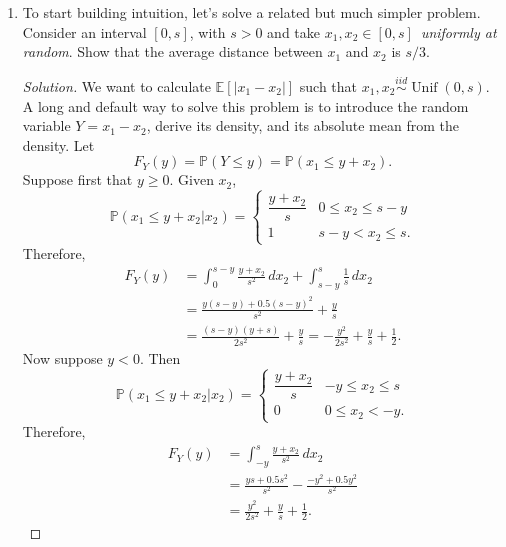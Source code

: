 \documentclass[a4paper,10pt, notitlepage]{report}
\newcommand{\unif}{\operatorname{Unif}}
\newcommand{\ev}{\mathbb{E}}
\newcommand{\pr}{\mathbb{P}}
\begin{document}
\begin{enumerate}
 \item To start building intuition, let's solve a related but much simpler problem.
 Consider an interval $[0, s]$, with $s>0$ and take $x_1,x_2 \in [0, s]$~\textit{uniformly at random}.
 Show that the average distance between $x_1$ and $x_2$ is $s/3$.

 \begin{proof}[Solution]
    We want to calculate $\ev[|x_1 - x_2|]$ such that $x_1, x_2
    \overset{iid}{\sim} \unif(0,s)$. A long and default way to solve this problem is
    to introduce the random variable $Y = x_1 - x_2$, derive its density,
    and its absolute mean from the density. Let
    \begin{equation*}
        F_Y(y) = \pr(Y \le y) = \pr(x_1 \le y + x_2).
    \end{equation*}
    Suppose first that $y \ge 0$. Given
    $x_2$, 
    $$\pr(x_1 \le y + x_2|x_2) = \begin{cases}
        \dfrac{y + x_2}{s} &0 \le x_2 \le s - y \\
        1 &s - y < x_2 \le s.
    \end{cases}$$
    Therefore, 
    \begin{equation*}
        \begin{split}
            F_Y(y) &= \int_0^{s-y} \frac{y+x_2}{s^2} \, dx_2 + \int_{s-y}^s \frac{1}{s} \, dx_2  \\
            &= \frac{y(s-y) + 0.5(s-y)^2}{s^2} + \frac{y}{s} \\
            &= \frac{(s-y)(y + s)}{2s^2} + \frac{y}{s} = - \frac{y^2}{2s^2} + \frac{y}{s} + \frac{1}{2}.
        \end{split}
    \end{equation*}
    Now suppose $y < 0$. Then 
    $$\pr(x_1 \le y + x_2|x_2) = \begin{cases}
        \dfrac{y + x_2}{s} &-y \le x_2 \le s \\
        0 &0 \le x_2 < -y.
    \end{cases}$$
    Therefore, 
    \begin{equation*}
        \begin{split}
            F_Y(y) &= \int_{-y}^{s} \frac{y+x_2}{s^2} \, dx_2 \\
            &= \frac{ys + 0.5s^2}{s^2} - \frac{-y^2 + 0.5y^2}{s^2} \\
            &= \frac{y^2}{2s^2} + \frac{y}{s} + \frac{1}{2}.
        \end{split}
    \end{equation*}

\end{proof}
\end{enumerate}
\end{document}
